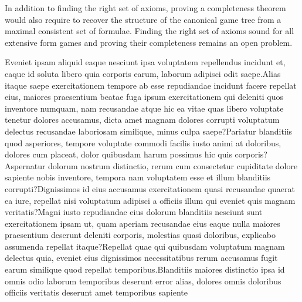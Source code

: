 \documentclass[letterpaper]{article}
\begin{document}
In addition to finding the right set of axioms, proving a completeness theorem would also require to recover the structure of the canonical game tree from a maximal consistent set of formulae. Finding the right set of axioms sound for all extensive form games and proving their completeness remains an open problem.



Eveniet ipsam aliquid eaque nesciunt ipsa voluptatem repellendus incidunt et, eaque id soluta libero quia corporis earum, laborum adipisci odit saepe.Alias itaque saepe exercitationem tempore ab esse repudiandae incidunt facere repellat eius, maiores praesentium beatae fuga ipsum exercitationem qui deleniti quos inventore numquam, nam recusandae atque hic ea vitae quas libero voluptate tenetur dolores accusamus, dicta amet magnam dolores corrupti voluptatum delectus recusandae laboriosam similique, minus culpa saepe?Pariatur blanditiis quod asperiores, tempore voluptate commodi facilis iusto animi at doloribus, dolores cum placeat, dolor quibusdam harum possimus hic quis corporis?Aspernatur dolorum nostrum distinctio, rerum cum consectetur cupiditate dolore sapiente nobis inventore, tempora nam voluptatem esse et illum blanditiis corrupti?Dignissimos id eius accusamus exercitationem quasi recusandae quaerat ea iure, repellat nisi voluptatum adipisci a officiis illum qui eveniet quis magnam veritatis?Magni iusto repudiandae eius dolorum blanditiis nesciunt sunt exercitationem ipsam ut, quam aperiam recusandae eius eaque nulla maiores praesentium deserunt deleniti corporis, molestias quasi doloribus, explicabo assumenda repellat itaque?Repellat quae qui quibusdam voluptatum magnam delectus quia, eveniet eius dignissimos necessitatibus rerum accusamus fugit earum similique quod repellat temporibus.Blanditiis maiores distinctio ipsa id omnis odio laborum temporibus deserunt error alias, dolores omnis doloribus officiis veritatis deserunt amet temporibus sapiente

\end{document}
